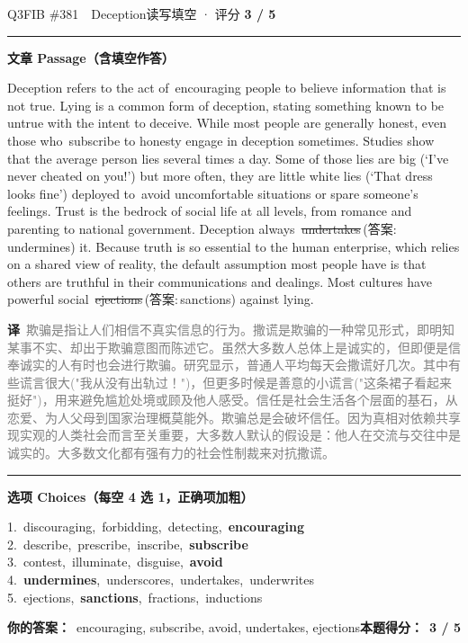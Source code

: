 \documentclass[11pt]{article}
\newcommand{\ptesub}[1]{%
  \par\needspace{2\baselineskip}\smallskip
  {\color{cAccent}\rule[-0.2ex]{3pt}{1.05em}}\hspace{6pt}%
  {\bfseries\color{cHead}#1}\par\nopagebreak\smallskip}
\newcommand{\zh}[1]{{\footnotesize\textcolor{cNote}{\textbf{译}}\ \textcolor{gray}{#1}}}
\newcommand{\rok}[1]{{\color{cFix}\ding{51}\,#1}}                 %
\newcommand{\rno}[2]{{\color{cWrong}\ding{55}\,\sout{#1}}\,{\footnotesize\color{cFix}(答案:\,#2)}}  %
\begin{document}
\begin{qblock}{Q3\quad FIB \#381\ \ Deception}{读写填空 · 评分 \textcolor{cAccent}{\bfseries 3 / 5}}
\ptesub{文章 Passage（含填空作答）}
\begin{promptbox}
Deception refers to the act of \rok{encouraging} people to believe information that is not true. Lying is a common form of deception, stating something known to be untrue with the intent to deceive. While most people are generally honest, even those who \rok{subscribe} to honesty engage in deception sometimes. Studies show that the average person lies several times a day. Some of those lies are big (`I've never cheated on you!') but more often, they are little white lies (`That dress looks fine') deployed to \rok{avoid} uncomfortable situations or spare someone's feelings. Trust is the bedrock of social life at all levels, from romance and parenting to national government. Deception always \rno{undertakes}{undermines} it. Because truth is so essential to the human enterprise, which relies on a shared view of reality, the default assumption most people have is that others are truthful in their communications and dealings. Most cultures have powerful social \rno{ejections}{sanctions} against lying.
\end{promptbox}
\zh{欺骗是指让人们相信不真实信息的行为。撒谎是欺骗的一种常见形式，即明知某事不实、却出于欺骗意图而陈述它。虽然大多数人总体上是诚实的，但即便是信奉诚实的人有时也会进行欺骗。研究显示，普通人平均每天会撒谎好几次。其中有些谎言很大("我从没有出轨过！")，但更多时候是善意的小谎言("这条裙子看起来挺好")，用来避免尴尬处境或顾及他人感受。信任是社会生活各个层面的基石，从恋爱、为人父母到国家治理概莫能外。欺骗总是会破坏信任。因为真相对依赖共享现实观的人类社会而言至关重要，大多数人默认的假设是：他人在交流与交往中是诚实的。大多数文化都有强有力的社会性制裁来对抗撒谎。}
\ptesub{选项 Choices（每空 4 选 1，正确项加粗）}
{\small
1.\ discouraging,\ forbidding,\ detecting,\ \textbf{encouraging}\\
2.\ describe,\ prescribe,\ inscribe,\ \textbf{subscribe}\\
3.\ contest,\ illuminate,\ disguise,\ \textbf{avoid}\\
4.\ \textbf{undermines},\ underscores,\ undertakes,\ underwrites\\
5.\ ejections,\ \textbf{sanctions},\ fractions,\ inductions}
\par\smallskip
\textbf{你的答案：}\ encouraging, subscribe, avoid, {\color{cWrong}undertakes, ejections}\qquad\textbf{本题得分：}\ {\color{cAccent}\bfseries 3 / 5}
\end{qblock}
\end{document}
